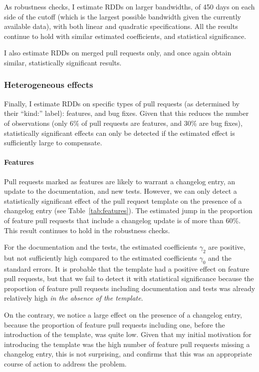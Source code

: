 As robustness checks, I estimate RDDs on larger bandwidths, of 450 days on each side of the cutoff (which is the largest possible bandwidth given the currently available data), with both linear and quadratic specifications.
All the results continue to hold with similar estimated coefficients, and statistical significance.

I also estimate RDDs on merged pull requests only, and once again obtain similar, statistically significant results.

\subsubsection{Heterogeneous effects}

Finally, I estimate RDDs on specific types of pull requests (as determined by their ``kind:'' label): features, and bug fixes.
Given that this reduces the number of observations (only 6\% of pull requests are features, and 30\% are bug fixes), statistically significant effects can only be detected if the estimated effect is sufficiently large to compensate.

\paragraph{Features}

Pull requests marked as features are likely to warrant a changelog entry, an update to the documentation, and new tests.
However, we can only detect a statistically significant effect of the pull request template on the presence of a changelog entry (see Table~\ref{tab:features}).
The estimated jump in the proportion of feature pull requests that include a changelog update is of more than 60\%.
This result continues to hold in the robustness checks.

For the documentation and the tests, the estimated coefficients $\gamma_2$ are positive, but not sufficiently high compared to the estimated coefficients $\gamma_0$ and the standard errors.
It is probable that the template had a positive effect on feature pull requests, but that we fail to detect it with statistical significance because the proportion of feature pull requests including documentation and tests was already relatively high \emph{in the absence of the template}.

On the contrary, we notice a large effect on the presence of a changelog entry, because the proportion of feature pull requests including one, before the introduction of the template, was quite low.
Given that my initial motivation for introducing the template was the high number of feature pull requests missing a changelog entry, this is not surprising, and confirms that this was an appropriate course of action to address the problem.

